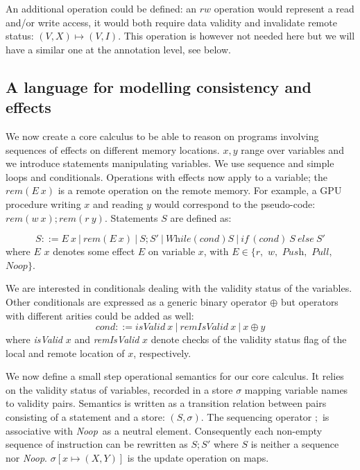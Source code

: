 \documentclass[preprint,12pt]{elsarticle}
\newcommand{\symb}[1]{\textit{#1}}
\newcommand{\noop}{\symb{Noop}}
\newcommand{\Push}{\symb{Push}}
\newcommand{\Pull}{\symb{Pull}}
\newcommand{\while}{\symb{While}}
\newcommand{\cond}{\symb{cond}}
\newcommand{\isvalid}{\symb{isValid}}
\newcommand{\isremvalid}{\symb{remIsValid}}
\newcommand{\rem}[1]{\symb{rem}(#1)}
\newcommand{\IF}[3]{\symb{if}\,(#1)~#2~\symb{else}~#3 }
\begin{document}
An additional operation could be defined: 
 an 
$rw$ operation would represent a read and/or write access, it would both require data 
validity and invalidate 
remote status: $(V,X)\mapsto (V,I)$. This operation is however not needed here but we will have a similar one at the annotation level, see below.

\subsection{A language for modelling consistency and effects}\label{sec-core}
We now create a core calculus to be able to reason on programs involving sequences of 
effects on different memory locations. $x,y$ range over variables and we introduce  statements manipulating 
variables. We use sequence and simple loops and conditionals. 
Operations with effects 
now apply to a variable;  the $\rem{E~x}$  is a remote operation 
 on the remote memory. For example, a GPU procedure 
writing $x$ and reading $y$ would correspond to the pseudo-code: $\rem{w~x};\rem{r~y}$. 
Statements $S$ are defined as:

{\small \[S::=E~x~|~\rem{E~x}~|~S;S'~|~\while(\cond) S ~|~ \IF{\cond}{S}{S'}\]}
\noindent where $E$ $x$ denotes some effect $E$ on variable $x$, with $E\in \{r,$ $w,$  
$\Push,$ $\Pull,$ $\noop\}$.

We are  interested  in conditionals dealing 
with the validity status of the variables. Other conditionals  are expressed as a generic 
binary operator $\oplus$ but  operators with different arities could be added as 
well:
\[\cond::=\isvalid~x~|~\isremvalid~x~|~x\oplus y\]
\noindent where \textit{isValid} $x$ and \textit{remIsValid} $x$ denote checks of the validity status flag of the local and remote location of $x$, respectively.

We now define a small step operational semantics for our core calculus.
It relies on the validity status of variables, recorded in a store $\sigma$ mapping 
variable names to validity pairs. Semantics is written as a transition relation between 
pairs consisting of a statement and a store: $(S,\sigma)$. The sequencing operator $;$ is associative with \noop\ as a neutral element. 
Consequently each non-empty sequence of instruction can be rewritten as $S;S'$ where $S$ 
is neither a 
sequence nor \noop. $\sigma[x\mapsto (X,Y)]$ is the update operation on maps. 
\end{document}
